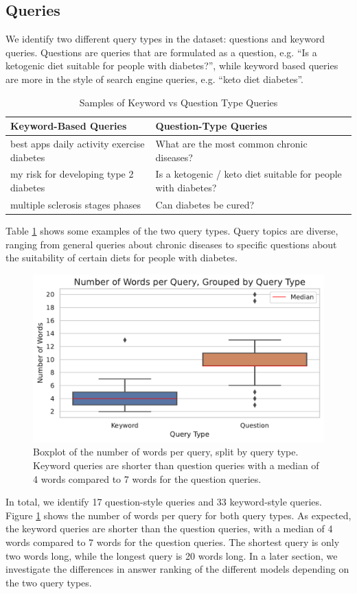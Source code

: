 \subsection{Queries}
We identify two different query types in the dataset: questions and keyword queries.
Questions are queries that are formulated as a question, e.g. ``Is a ketogenic diet suitable for people with diabetes?'', while keyword based queries are more in the style of search engine queries, e.g. ``keto diet diabetes''.
\begin{table}[tb]
\centering
\begin{tabularx}{\textwidth}{XX}
\hline
\textbf{Keyword-Based Queries} & \textbf{Question-Type Queries} \\
\hline
best apps daily activity exercise diabetes & What are the most common chronic diseases? \\
\hline
my risk for developing type 2 diabetes & Is a ketogenic / keto diet suitable for people with diabetes? \\
\hline
multiple sclerosis stages phases & Can diabetes be cured? \\
\hline
\end{tabularx}
\caption{Samples of Keyword vs Question Type Queries}
\label{table:querie-samples}
\end{table}
Table \ref{table:querie-samples} shows some examples of the two query types.
Query topics are diverse, ranging from general queries about chronic diseases to specific questions about the suitability of certain diets for people with diabetes.

\begin{figure}
\centering
\includegraphics[width=\textwidth]{images/num_words_per_query.pdf}
\caption{Boxplot of the number of words per query, split by query type. Keyword queries are shorter than question queries with a median of 4 words compared to 7 words for the question queries.}
\label{fig:num_words_per_query}
\end{figure}
In total, we identify 17 question-style queries and 33 keyword-style queries.
Figure \ref{fig:num_words_per_query} shows the number of words per query for both query types.
As expected, the keyword queries are shorter than the question queries, with a median of 4 words compared to 7 words for the question queries.
The shortest query is only two words long, while the longest query is 20 words long.
In a later section, we investigate the differences in answer ranking of the different models depending on the two query types.
